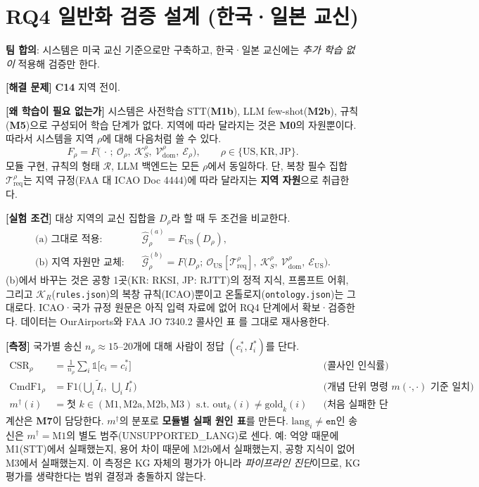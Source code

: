 \documentclass[10pt,a4paper]{article}
\newcommand{\G}{\mathcal{G}}
\newcommand{\KS}{\mathcal{K}_S}
\newcommand{\Ont}{\mathcal{O}}
\newcommand{\Treq}{\mathcal{T}_{\mathrm{req}}}
\newcommand{\Vdom}{\mathcal{V}_{\mathrm{dom}}}
\newcommand{\KR}{\mathcal{K}_R}
\newcommand{\cmd}[1]{\textsf{\small #1}}
\newcommand{\ch}[1]{\textbf{\textcolor{red!60!black}{#1}}}
\newcommand{\md}[1]{\textbf{\textcolor{blue!60!black}{#1}}}
\begin{document}
\section{RQ4 일반화 검증 설계 (한국·일본 교신)}\label{sec:rq4}
\textbf{팀 합의}: 시스템은 미국 교신 기준으로만 구축하고, 한국·일본 교신에는 \emph{추가 학습 없이} 적용해 검증만 한다.

\textbf{[해결 문제]} \ch{C14} 지역 전이.

\textbf{[왜 학습이 필요 없는가]} 시스템은 사전학습 STT(\md{M1b}), LLM few-shot(\md{M2b}), 규칙(\md{M5})으로 구성되어 학습 단계가 없다. 지역에 따라 달라지는 것은 \md{M0}의 자원뿐이다. 따라서 시스템을 지역 $\rho$에 대해 다음처럼 쓸 수 있다.
\begin{equation}
F_{\rho} = F\big(\,\cdot\,;\ \Ont_{\rho},\ \KS^{\rho},\ \Vdom^{\rho},\ \mathcal{E}_{\rho}\big),\qquad \rho\in\{\mathrm{US},\mathrm{KR},\mathrm{JP}\}.
\end{equation}
모듈 구현, 규칙의 형태 $\mathcal{R}$, LLM 백엔드는 모든 $\rho$에서 동일하다. 단, 복창 필수 집합 $\Treq^{\rho}$는 지역 규정(FAA 대 ICAO Doc 4444)에 따라 달라지는 \textbf{지역 자원}으로 취급한다.

\textbf{[실험 조건]} 대상 지역의 교신 집합을 $D_\rho$라 할 때 두 조건을 비교한다.
\begin{align}
\text{(a) 그대로 적용:}&\quad \hat{\G}^{(a)}_\rho = F_{\mathrm{US}}(D_\rho),\\
\text{(b) 지역 자원만 교체:}&\quad \hat{\G}^{(b)}_\rho = F\big(D_\rho;\ \Ont_{\mathrm{US}}[\Treq^{\rho}],\ \KS^{\rho},\ \Vdom^{\rho},\ \mathcal{E}_{\mathrm{US}}\big).
\end{align}
(b)에서 바꾸는 것은 공항 1곳(KR: \cmd{RKSI}, JP: \cmd{RJTT})의 정적 지식, 프롬프트 어휘, 그리고 $\KR$(\texttt{rules.json})의 복창 규칙(ICAO)뿐이고 온톨로지(\texttt{ontology.json})는 그대로다. ICAO·국가 규정 원문은 아직 입력 자료에 없어 RQ4 단계에서 확보·검증한다. 데이터는 OurAirports와 FAA JO 7340.2 콜사인 표 \cite{faa7340}를 그대로 재사용한다.

\textbf{[측정]} 국가별 송신 $n_\rho\approx 15$--$20$개에 대해 사람이 정답 $(c^*_i, I^*_i)$를 단다.
\begin{align}
\mathrm{CSR}_\rho &= \frac{1}{n_\rho}\sum_{i}\mathbb{1}\big[c_i = c^*_i\big] &&\text{(콜사인 인식률)}\\
\mathrm{CmdF1}_\rho &= \mathrm{F1}\Big(\textstyle\bigcup_i \tilde I_i,\ \bigcup_i I^*_i\Big) &&\text{(개념 단위 명령 인식, $m(\cdot,\cdot)$ 기준 일치)}\\
m^\dagger(i) &= \text{첫 } k\in(\mathrm{M1},\mathrm{M2a},\mathrm{M2b},\mathrm{M3}) \text{ s.t. } \mathrm{out}_{k}(i)\neq \mathrm{gold}_{k}(i) &&\text{(처음 실패한 단계)}
\end{align}
계산은 \md{M7}이 담당한다. $m^\dagger$의 분포로 \textbf{모듈별 실패 원인 표}를 만든다. $\mathrm{lang}_i\neq\texttt{en}$인 송신은 $m^\dagger=\mathrm{M1}$의 별도 범주(\cmd{UNSUPPORTED\_LANG})로 센다. 예: 억양 때문에 M1(STT)에서 실패했는지, 용어 차이 때문에 M2b에서 실패했는지, 공항 지식이 없어 M3에서 실패했는지. 이 측정은 KG 자체의 평가가 아니라 \emph{파이프라인 진단}이므로, KG 평가를 생략한다는 범위 결정과 충돌하지 않는다.
\end{document}
